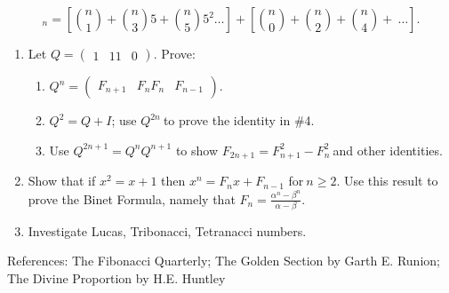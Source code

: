 \[
_{n} = \left\lbrack \binom{n}{1}  + \binom{n}{3} 5 + \binom{n}{5} 5^{2}\ldots \right\rbrack + \left\lbrack \binom{n}{0}  + \binom{n}{2}  + \binom{n}{4}  + \ \ldots \right\rbrack.
\]
\begin{enumerate}
\def\labelenumi{\arabic{enumi}.}

\item
  Let \(Q =
\begin{pmatrix}
  1 & 1
  1 & 0
  \end{pmatrix}
\). Prove:
\begin{enumerate}
  \def\labelenumii{\alph{enumii}.}

  \item
    \(Q^{n} =
\begin{pmatrix}
    F_{n + 1} & F_{n}
    F_{n} & F_{n - 1}
    \end{pmatrix}
\).
  \item
    \(Q^{2} = Q + I\); use \(Q^{2n}\ \)to prove the identity in \#4.
  \item
    Use \(Q^{2n + 1} = Q^{n}Q^{n + 1}\) to show
    \(F_{2n + 1} = F_{n + 1}^{2} - F_{n}^{2}\ \)and other identities.

\end{enumerate}
\item
  Show that if \(x^{2} = x + 1\) then \(x^{n} = F_{n}x + F_{n - 1}\)
  for\(\ n \geq 2\). Use this result to prove the Binet Formula, namely
  that \(F_{n} = \frac{\alpha^{n} - \beta^{n}}{\alpha - \beta}\).
\item
  Investigate Lucas, Tribonacci, Tetranacci numbers.

\end{enumerate}

References: The Fibonacci Quarterly; The Golden Section by Garth E.
Runion; The Divine Proportion by H.E. Huntley


